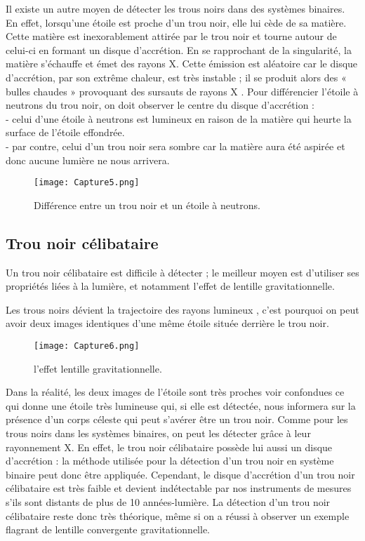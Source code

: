 \documentclass[12pt,  a4paper, openright]{report} %
\begin{document}
	
	Il existe un autre moyen de détecter les trous noirs dans des systèmes binaires. En effet, lorsqu’une étoile est proche d’un trou noir, elle lui cède de sa matière. Cette matière est inexorablement attirée par le trou noir et tourne autour de celui-ci en formant un disque d'accrétion. En se rapprochant de la singularité, la matière s’échauffe et émet des rayons X. Cette émission est aléatoire car le disque d’accrétion, par son extrême chaleur, est très instable ; il se produit alors des « bulles chaudes » provoquant des sursauts de rayons X \cite{5}.
	Pour différencier l’étoile à neutrons du trou noir, on doit observer le centre du disque d’accrétion :\\
	- celui d’une étoile à neutrons est lumineux en raison de la matière	
	qui heurte la surface de l’étoile effondrée.\\
	- par contre, celui d’un trou noir sera sombre car la matière aura été	
	aspirée et donc aucune lumière ne nous arrivera.
	\begin{figure}[H]
		
	
	\begin{center}
		\texttt{[image: Capture5.png]}
		
	\end{center}
	\caption{Différence entre un trou noir et un étoile à neutrons.} 
\end{figure}
	
	\subsection{ Trou noir célibataire }
	Un trou noir célibataire est difficile à détecter ; le meilleur moyen est d’utiliser ses propriétés liées à la lumière, et notamment l'effet de lentille gravitationnelle.
	
	Les trous noirs dévient la trajectoire des rayons lumineux , c'est pourquoi on peut avoir deux images identiques d'une même étoile située derrière le trou noir.\\
	\begin{figure}[H]
	\begin{center}
		\centering
		\texttt{[image: Capture6.png]}
			
	\end{center}
\caption{l'effet lentille gravitationnelle.}
\end{figure}
	
	Dans la réalité, les deux images de l’étoile sont très proches voir confondues ce qui donne une étoile très lumineuse qui, si elle est détectée, nous informera sur la présence d’un corps céleste qui peut s’avérer être un trou noir.
	Comme pour les trous noirs dans les systèmes binaires, on peut les détecter grâce à leur rayonnement X. En effet, le trou noir célibataire possède lui aussi un disque d’accrétion : la méthode utilisée pour la détection d’un trou noir en système binaire peut donc être appliquée. Cependant, le disque d’accrétion d’un trou noir célibataire est très faible et devient indétectable par nos instruments de mesures s'ils sont distants de plus de 10 années-lumière.
	La détection d’un trou noir célibataire reste donc très théorique, même si on a réussi à observer un exemple flagrant de lentille convergente gravitationnelle.
	
\end{document}
